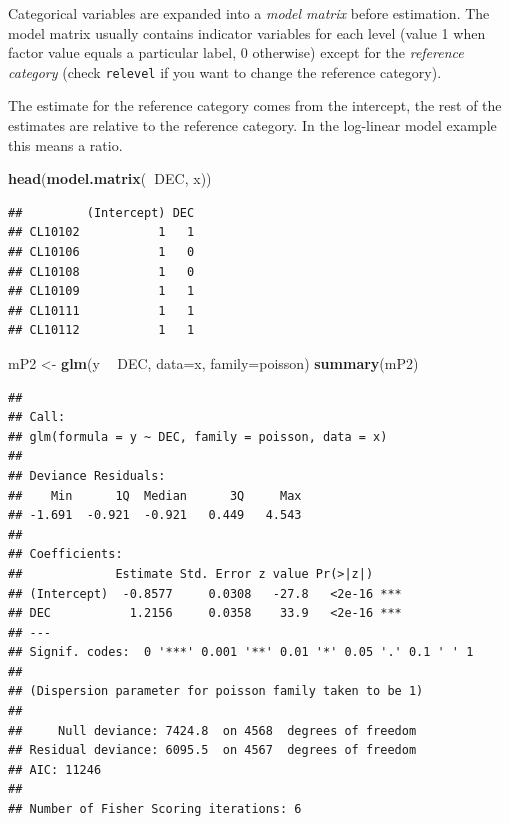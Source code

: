 \documentclass[12pt,]{book}
\newenvironment{Shaded}{\begin{snugshade}}{\end{snugshade}}
\newcommand{\DataTypeTok}[1]{\textcolor[rgb]{0.13,0.29,0.53}{#1}}
\newcommand{\KeywordTok}[1]{\textcolor[rgb]{0.13,0.29,0.53}{\textbf{#1}}}
\newcommand{\NormalTok}[1]{#1}
\newcommand{\OperatorTok}[1]{\textcolor[rgb]{0.81,0.36,0.00}{\textbf{#1}}}
\newcommand{\StringTok}[1]{\textcolor[rgb]{0.31,0.60,0.02}{#1}}
\begin{document}
Categorical variables are expanded into a \emph{model matrix} before estimation.
The model matrix usually contains indicator variables for each level
(value 1 when factor value equals a particular label, 0 otherwise)
except for the \emph{reference category}
(check \texttt{relevel} if you want to change the reference category).

The estimate for the reference category comes from the intercept,
the rest of the estimates are relative to the reference category.
In the log-linear model example this means a ratio.

\begin{Shaded}
\begin{Highlighting}[]
\KeywordTok{head}\NormalTok{(}\KeywordTok{model.matrix}\NormalTok{(}\OperatorTok{~}\NormalTok{DEC, x))}
\end{Highlighting}
\end{Shaded}

\begin{verbatim}
##         (Intercept) DEC
## CL10102           1   1
## CL10106           1   0
## CL10108           1   0
## CL10109           1   1
## CL10111           1   1
## CL10112           1   1
\end{verbatim}

\begin{Shaded}
\begin{Highlighting}[]
\NormalTok{mP2 <-}\StringTok{ }\KeywordTok{glm}\NormalTok{(y }\OperatorTok{~}\StringTok{ }\NormalTok{DEC, }\DataTypeTok{data=}\NormalTok{x, }\DataTypeTok{family=}\NormalTok{poisson)}
\KeywordTok{summary}\NormalTok{(mP2)}
\end{Highlighting}
\end{Shaded}

\begin{verbatim}
## 
## Call:
## glm(formula = y ~ DEC, family = poisson, data = x)
## 
## Deviance Residuals: 
##    Min      1Q  Median      3Q     Max  
## -1.691  -0.921  -0.921   0.449   4.543  
## 
## Coefficients:
##             Estimate Std. Error z value Pr(>|z|)    
## (Intercept)  -0.8577     0.0308   -27.8   <2e-16 ***
## DEC           1.2156     0.0358    33.9   <2e-16 ***
## ---
## Signif. codes:  0 '***' 0.001 '**' 0.01 '*' 0.05 '.' 0.1 ' ' 1
## 
## (Dispersion parameter for poisson family taken to be 1)
## 
##     Null deviance: 7424.8  on 4568  degrees of freedom
## Residual deviance: 6095.5  on 4567  degrees of freedom
## AIC: 11246
## 
## Number of Fisher Scoring iterations: 6
\end{verbatim}
\end{document}
